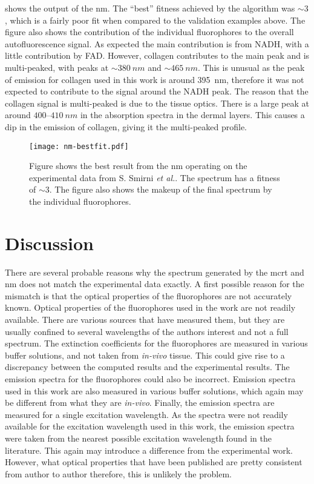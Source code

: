  shows the output of the \gls*{nm}.
The ``best'' fitness achieved by the algorithm was $\sim3$, which is a fairly poor fit when compared to the validation examples above.
The figure also shows the contribution of the individual fluorophores to the overall autofluorescence signal.
As expected the main contribution is from NADH, with a little contribution by FAD\@.
However, collagen contributes to the main peak and is multi-peaked, with peaks at $\sim380~nm$ and $\sim 465~nm$.
This is unusual as the peak of emission for collagen used in this work is around 395~nm, therefore it was not expected to contribute to the signal around the NADH peak.
The reason that the collagen signal is multi-peaked is due to the tissue optics.
There is a large peak at around $400$--$410~nm$ in the absorption spectra in the dermal layers.
This causes a dip in the emission of collagen, giving it the multi-peaked profile.

\begin{figure}[!htpb]
  \centering
  \texttt{[image: nm-bestfit.pdf]}
  \caption{Figure shows the best result from the \gls*{nm} operating on the experimental data from S. Smirni \textit{et al.}. The spectrum has a fitness of $\sim 3$. The figure also shows the makeup of the final spectrum by the individual fluorophores.}
  \label{fig:bestNMresult}
\end{figure}

\section{Discussion}

There are several probable reasons why the spectrum generated by the \gls*{mcrt} and \gls*{nm} does not match the experimental data exactly.
A first possible reason for the mismatch is that the optical properties of the fluorophores are not accurately known.
Optical properties of the fluorophores used in the work are not readily available.
There are various sources that have measured them, but they are usually confined to several wavelengths of the authors interest and not a full spectrum.
The extinction coefficients for the fluorophores are measured in various buffer solutions, and not taken from \textit{in-vivo} tissue.
This could give rise to a discrepancy between the computed results and the experimental results.
The emission spectra for the fluorophores could also be incorrect.
Emission spectra used in this work are also measured in various buffer solutions, which again may be different from what they are \textit{in-vivo}.
Finally, the emission spectra are measured for a single excitation wavelength.
As the spectra were not readily available for the excitation wavelength used in this work, the emission spectra were taken from the nearest possible excitation wavelength found in the literature. This again may introduce a difference from the experimental work.
However, what optical properties that have been published are pretty consistent from author to author therefore, this is unlikely the problem.


